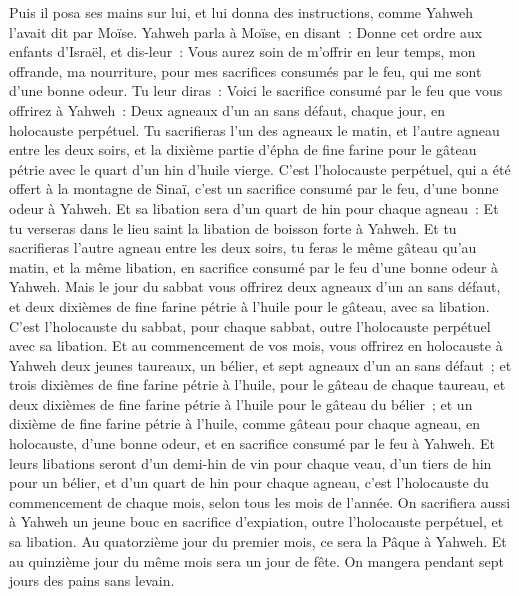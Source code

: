 \begin{multicols}{2}
Puis il posa ses mains sur lui, et lui donna des instructions, comme Yahweh l'avait dit par Moïse.
\VerseOne{}Yahweh parla à Moïse, en disant~:
Donne cet ordre aux enfants d'Israël, et dis-leur~: Vous aurez soin de m'offrir en leur temps, mon offrande, ma nourriture, pour mes sacrifices consumés par le feu, qui me sont d'une bonne odeur.
Tu leur diras~: Voici le sacrifice consumé par le feu que vous offrirez à Yahweh~: Deux agneaux d'un an sans défaut, chaque jour, en holocauste perpétuel.
Tu sacrifieras l'un des agneaux le matin, et l'autre agneau entre les deux soirs,
et la dixième partie d'épha de fine farine pour le gâteau pétrie avec le quart d'un hin d'huile vierge.
C'est l'holocauste perpétuel, qui a été offert à la montagne de Sinaï, c'est un sacrifice consumé par le feu, d'une bonne odeur à Yahweh.
Et sa libation sera d'un quart de hin pour chaque agneau~: Et tu verseras dans le lieu saint la libation de boisson forte à Yahweh.
Et tu sacrifieras l'autre agneau entre les deux soirs, tu feras le même gâteau qu'au matin, et la même libation, en sacrifice consumé par le feu d'une bonne odeur à Yahweh.
Mais le jour du sabbat vous offrirez deux agneaux d'un an sans défaut, et deux dixièmes de fine farine pétrie à l'huile pour le gâteau, avec sa libation.
C'est l'holocauste du sabbat, pour chaque sabbat, outre l'holocauste perpétuel avec sa libation.
Et au commencement de vos mois, vous offrirez en holocauste à Yahweh deux jeunes taureaux, un bélier, et sept agneaux d'un an sans défaut~;
et trois dixièmes de fine farine pétrie à l'huile, pour le gâteau de chaque taureau, et deux dixièmes de fine farine pétrie à l'huile pour le gâteau du bélier~;
et un dixième de fine farine pétrie à l'huile, comme gâteau pour chaque agneau, en holocauste, d'une bonne odeur, et en sacrifice consumé par le feu à Yahweh.
Et leurs libations seront d'un demi-hin de vin pour chaque veau, d'un tiers de hin pour un bélier, et d'un quart de hin pour chaque agneau, c'est l'holocauste du commencement de chaque mois, selon tous les mois de l'année.
On sacrifiera aussi à Yahweh un jeune bouc en sacrifice d'expiation, outre l'holocauste perpétuel, et sa libation.
Au quatorzième jour du premier mois, ce sera la Pâque à Yahweh.
Et au quinzième jour du même mois sera un jour de fête. On mangera pendant sept jours des pains sans levain.

\end{multicols}
